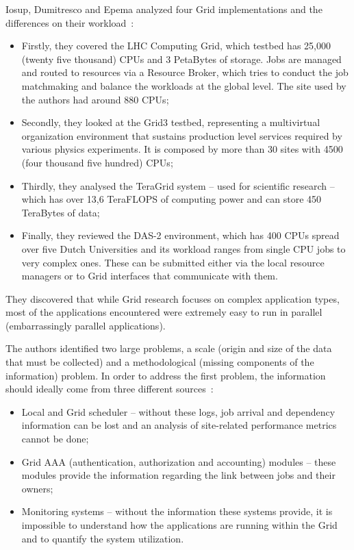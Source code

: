 Iosup, Dumitresco and Epema analyzed four Grid implementations and the differences on their workload~\cite{iosup}:
\begin{itemize} 
\item Firstly, they covered the LHC Computing Grid, which testbed has 25,000 (twenty five thousand) CPUs and 3 PetaBytes of storage. Jobs are managed and routed to resources via a Resource Broker, which tries to conduct the job matchmaking and balance the workloads at the global level. The site used by the authors had around 880 CPUs;
\item Secondly, they looked at the Grid3 testbed, representing a multivirtual organization environment that sustains production level services required by various physics experiments. It is composed by more than 30 sites with 4500 (four thousand five hundred) CPUs;
\item Thirdly, they analysed the TeraGrid system -- used for scientific research -- which has over 13,6 TeraFLOPS of computing power and can store 450 TeraBytes of data;
\item Finally, they reviewed the DAS-2 environment, which has 400 CPUs spread over five Dutch Universities and its workload ranges from single CPU jobs to very complex ones. These can be submitted either via the local resource managers or to Grid interfaces that communicate with them. 
\end{itemize}

They discovered that while Grid research focuses on complex application types, most of the applications encountered were extremely easy to run in parallel (embarrassingly parallel applications).

The authors identified two large problems, a scale (origin and size of the data that must be collected) and a methodological (missing components of the information) problem. In order to address the first problem, the information should ideally come from three different sources~\cite{iosup}:
\begin{itemize}
\item Local and Grid scheduler -- without these logs, job arrival and dependency information can be lost and an analysis of site-related performance metrics cannot be done;
\item Grid AAA (authentication, authorization and accounting) modules -- these modules provide the information regarding the link between jobs and their owners;
\item Monitoring systems -- without the information these systems provide, it is impossible to understand how the applications are running within the Grid and to quantify the system utilization.
\end{itemize}


